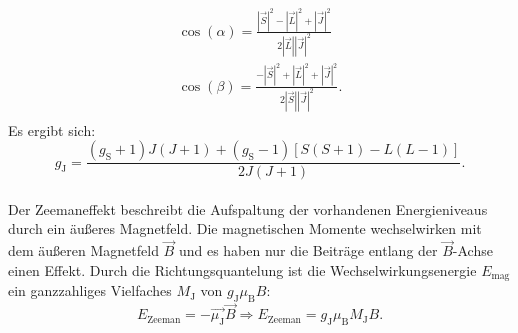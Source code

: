 \begin{align*}
  \cos{(\alpha)} = \frac{ |\vec{S}|^2 - |\vec{L}|^2 + |\vec{J}|^2}{2 |\vec{L}||\vec{J}|^2} \\%
  \cos{(\beta)}  = \frac{-|\vec{S}|^2 + |\vec{L}|^2 + |\vec{J}|^2}{2 |\vec{S}||\vec{J}|^2}.\\%
\end{align*}
Es ergibt sich:
\begin{equation}
  g_{\text{J}}= \frac{\left(g_{\text{S}} +1 \right)J\left(J+1\right) + \left(g_{\text{S}}-1\right) \left[ S\left(S+1\right)-L\left(L-1\right) \right]   }{2J\left(J+1\right)}.
\label{eqn:landej}
\end{equation}
%
%
\\Der Zeemaneffekt beschreibt die Aufspaltung der vorhandenen Energieniveaus durch ein äußeres Magnetfeld.
Die magnetischen Momente wechselwirken mit dem äußeren Magnetfeld $\vec{B}$ und es haben nur die Beiträge entlang der $\vec{B}$-Achse einen Effekt.
Durch die Richtungsquantelung ist die Wechselwirkungsenergie $E_{\text{mag}}$ ein ganzzahliges Vielfaches $M_{\text{J}}$ von $g_{\text{J}} \mu_{\text{B}} B$:
\begin{equation}
  E_{\text{Zeeman}} = -\vec{\mu_{\text{J}}} \vec{B} \Rightarrow E_{\text{Zeeman}} = g_{\text{J}} \mu_{\text{B}} M_{\text{J}} B.
  \label{eqn:zeeman}
\end{equation}
%
